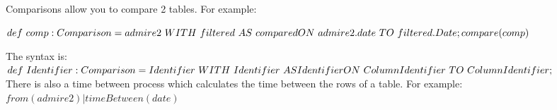 Comparisons allow you to compare 2 tables. For example:

$def\ comp : Comparison = admire2\ WITH\ filtered\ AS\ compared \\
ON\ admire2.date\ TO\ filtered.Date; \\
compare(comp)$

The syntax is:
$
def\ Identifier : Comparison = Identifier\ WITH\ Identifier\ AS Identifier\ \\
ON\ ColumnIdentifier\ TO\ ColumnIdentifier;$ \\

There is also a time between process which calculates the time between the rows of a table. For example:
$from(admire2)|timeBetween(date)$